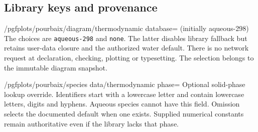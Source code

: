 \documentclass[a4paper,11pt]{ltxdoc}
\begin{document}
\subsection{Library keys and provenance}
\begin{key}{/pgfplots/pourbaix/diagram/thermodynamic database= (initially aqueous-298)}
The choices are \texttt{aqueous-298} and \texttt{none}. The latter disables
library fallback but retains user-data closure and the authorized water default.
There is no network request at declaration, checking, plotting or typesetting.
The selection belongs to the immutable diagram snapshot.
\end{key}
\begin{key}{/pgfplots/pourbaix/species data/thermodynamic phase=}
Optional solid-phase lookup override. Identifiers start with a lowercase letter
and contain lowercase letters, digits and hyphens. Aqueous species cannot have
this field. Omission selects the documented default when one exists. Supplied
numerical constants remain authoritative even if the library lacks that phase.
\end{key}
\end{document}
